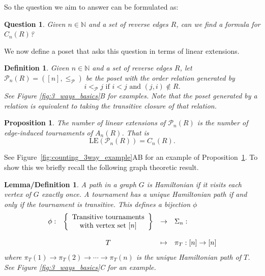\documentclass[9pt,a4paper,oneside]{article}
\newtheorem{lemma_definition}[theorem]{Lemma/Definition}
\newtheorem{proposition}[theorem]{Proposition}
\newtheorem{definition}[theorem]{Definition}
\newtheorem{question}[theorem]{Question}
\newcommand{\cP}{\mathcal{P}}
\newcommand{\lex}{\mathrm{LE}}
\begin{document}
So the question we aim to answer can be formulated as:
\begin{question}\label{que:1}
Given $n\in\mathbb{N}$ and a set of reverse edges $R$, can we find a formula for $C_n(R)$?
\end{question}

We now define a poset that asks this question in terms of linear extensions. 

\begin{definition}
Given $n\in\mathbb{N}$ and a set of reverse edges $R$, let $\cP_n(R)=([n], \leq_{\cP})$ be the poset with the order relation generated by 
\[i<_{\cP} j \text{ if } i<j \text{ and } (j,i)\notin R.\]
See Figure \ref{fig:3_ways_basics}B for examples. Note that the poset generated by a relation is equivalent to taking the transitive closure of that relation.
\end{definition}

\begin{proposition}\label{prop:posets_and_graphs}
The number of linear extensions of $\cP_n(R)$ is the number of edge-induced tournaments of $A_n(R)$.  That is 
\[\lex(\cP_n(R)) = C_n(R).\]
\end{proposition}
See Figure~\ref{fig:counting_3way_example}AB for an example of Proposition~\ref{prop:posets_and_graphs}. 
To show this we briefly recall the following graph theoretic result.


\begin{lemma_definition}\label{lem:HamPath}\cite[Theorem 1.5.2]{Iyer16}
A path in a graph $G$ is \emph{Hamiltonian} if it visits each vertex of $G$ exactly once.
A tournament has a unique Hamiltonian path if and only if the tournament is transitive.
This defines a bijection $\phi$ 
\[\begin{array}{c c c l}
\phi: & \left\{  \begin{array}{c}
						\text{Transitive tournaments}\\ 
						\text{with vertex set }[n] 
						\end{array}\right\}							& \to 			& \Sigma_n: \\
						&&&\\
        & T                                                      & \mapsto 	& \pi_T:[n]\to[n]
\end{array}\]
where  $\pi_T(1) \to \pi_T(2) \to \cdots \to \pi_T(n)$ is the unique Hamiltonian path of $T$.  See Figure \ref{fig:3_ways_basics}C for an example.
\end{lemma_definition}
\end{document}
